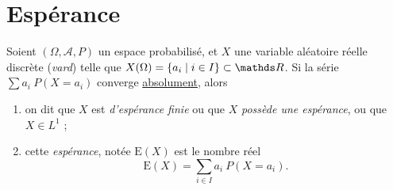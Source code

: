 \vspace{-6.5mm}

\section{Espérance}

\vspace{-3mm}

\begin{defn}
  Soient $(\Omega, \mathcal{A}, P)$\/ un espace probabilisé, et $X$\/ une variable aléatoire réelle discrète (\textit{vard}) telle que $X(\Omega) = \{ a_i  \mid i \in I\} \subset \R$. Si la série $\sum a_i\:P(X = a_i)$\/ converge \ul{absolument}\footnotemark, alors
  \begin{enumerate}
    \item on dit que $X$\/ est \textit{d'espérance finie} ou que $X$\/ \textit{possède une espérance}, ou que $X \in L^1$\/ ;
    \item cette \textit{espérance}, notée $\mathrm{E}(X)$\/ est le nombre réel \[
      \mathrm{E}(X) = \sum_{i \in I} a_i\: P(X = a_i)
    .\]
  \end{enumerate}
\end{defn}

